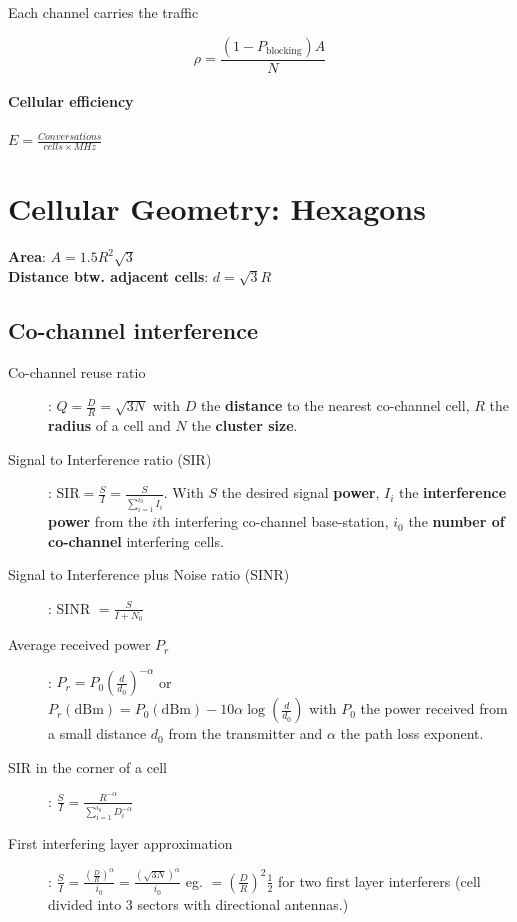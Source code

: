 \documentclass[10pt, a4paper,twocolumn]{scrartcl}
\begin{document}
Each channel carries the traffic 

\begin{equation*}
	\rho = \frac{(1 - P_\textrm{blocking})A}{N}
\end{equation*}

\paragraph{Cellular efficiency} $E = \frac{Conversations}{cells\times MHz}$

\section{Cellular Geometry: Hexagons}

\textbf{Area}: $A=1.5R^2\sqrt{3}$\\
\textbf{Distance btw. adjacent cells}: $d=\sqrt{3}R$

\subsection{Co-channel interference}
\begin{description}
\item[Co-channel reuse ratio]: $Q = \frac{D}{R} = \sqrt{3N}$ with $D$ the \textbf{distance} to the nearest co-channel cell, $R$ the \textbf{radius} of a cell and $N$ the \textbf{cluster size}.

\item[Signal to Interference ratio (SIR)]: $\textrm{SIR} = \frac{S}{I} = \frac{S}{\sum^{i_0}_{i=1}I_i}$. With $S$ the desired signal \textbf{power}, $I_i$ the \textbf{interference power} from the $i$th interfering co-channel base-station, $i_0$ the \textbf{number of co-channel} interfering cells.

\item[Signal to Interference plus Noise ratio (SINR)] : SINR $= \frac{S}{I + N_0}$

\item[Average received power $P_r$]: $P_r = P_0(\frac{d}{d_0})^{-\alpha}$ or \\ 
$P_r(\textrm{dBm}) = P_0(\textrm{dBm})-10\alpha\log(\frac{d}{d_0})$ with $P_0$ the power received from a small distance $d_0$ from the transmitter and $\alpha$ the path loss exponent.
	
\item[SIR in the corner of a cell]: $\frac{S}{I} = \frac{R^{-\alpha}}{\sum^{i_0}_{i=1}D_i^{-\alpha}}$

\item[First interfering layer approximation]: $\frac{S}{I} = \frac{(\frac{D}{R})^\alpha}{i_0} = \frac{(\sqrt{3N})^\alpha}{i_0}$ eg. $=(\frac{D}{R})^2\frac{1}{2}$ for two first layer interferers (cell divided into 3 sectors with directional antennas.)

\end{description}
\end{document}
